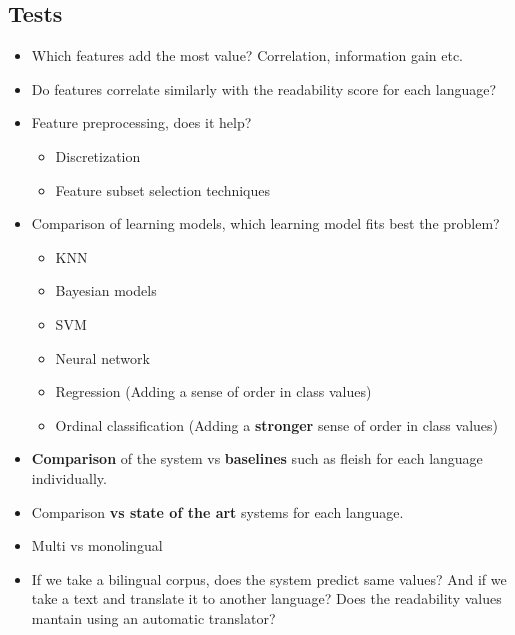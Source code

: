 \documentclass[12pt]{article}
\begin{document}
\subsection{Tests}

\begin{itemize}

\item Which features add the most value? Correlation, information gain etc.

\item Do features correlate similarly with the readability score for each language?

\item Feature preprocessing, does it help?
	\begin{itemize}
	\item Discretization
	\item Feature subset selection techniques
	\end{itemize}
	
\item Comparison of learning models, which learning model fits best the problem?
	\begin{itemize}
	\item KNN
	\item Bayesian models
	\item SVM
	\item Neural network
	\item Regression (Adding a sense of order in class values)
	\item Ordinal classification (Adding a \textbf{stronger} sense of order in class values)
	\end{itemize}

\item \textbf{Comparison} of the system vs \textbf{baselines} such as fleish for each language individually.

\item Comparison \textbf{vs state of the art} systems for each language.

\item Multi vs monolingual
\item If we take a bilingual corpus, does the system predict same values? And if we take a text and translate it to another language? Does the readability values mantain using an automatic translator?
\end{itemize}
\end{document}
